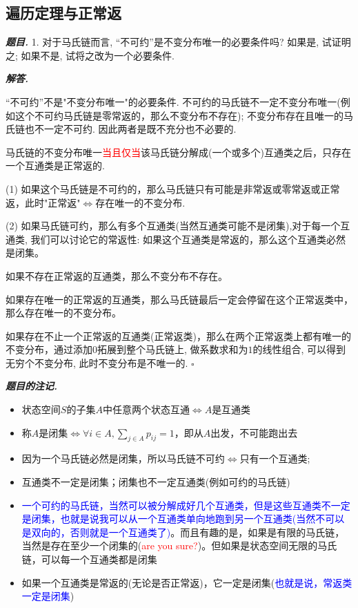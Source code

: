 \documentclass[10pt, a4paper, oneside]{ctexart}
\newenvironment{problem}{\begin{framed}\par\noindent\textbf{\textit{题目. }}}{\end{framed}\par}
\newenvironment{solution}{%
  \par\noindent\textbf{\textit{解答. }}\ignorespaces
}{%
  \hfill\ensuremath{\square}\par %
}
\newenvironment{note}{\par\noindent\textbf{\textit{题目的注记. }}\ignorespaces}{\par}
\begin{document}
\subsection{遍历定理与正常返}
\begin{problem}
    1. 对于马氏链而言, “不可约”是不变分布唯一的必要条件吗? 如果是, 试证明之; 如果不是, 试将之改为一个必要条件.
\end{problem}
\begin{solution}
    “不可约”不是"不变分布唯一"的必要条件. 不可约的马氏链不一定不变分布唯一(例如这个不可约马氏链是零常返的，那么不变分布不存在); 不变分布存在且唯一的马氏链也不一定不可约. 因此两者是既不充分也不必要的.
    
    马氏链的不变分布唯一\textcolor{red}{当且仅当}该马氏链分解成(一个或多个)互通类之后，只存在一个互通类是正常返的.
    
    (1) 如果这个马氏链是不可约的，那么马氏链只有可能是非常返或零常返或正常返，此时"正常返"$\iff$存在唯一的不变分布.

    (2) 如果马氏链可约，那么有多个互通类(当然互通类可能不是闭集),对于每一个互通类, 我们可以讨论它的常返性: 如果这个互通类是常返的，那么这个互通类必然是闭集。
    
    如果不存在正常返的互通类，那么不变分布不存在。
    
    如果存在唯一的正常返的互通类，那么马氏链最后一定会停留在这个正常返类中，那么存在唯一的不变分布。

    如果存在不止一个正常返的互通类(正常返类)，那么在两个正常返类上都有唯一的不变分布，通过添加$0$拓展到整个马氏链上, 做系数求和为$1$的线性组合, 可以得到无穷个不变分布, 此时不变分布是不唯一的.
\end{solution}
\begin{note}
    \begin{itemize}
        \item 状态空间$S$的子集$A$中任意两个状态互通$\iff A$是互通类 
        \item 称$A$是闭集$\iff \forall i\in A, \sum_{j\in A}p_{ij}=1$，即从$A$出发，不可能跑出去
        \item 因为一个马氏链必然是闭集，所以马氏链不可约$\iff$只有一个互通类; 
        \item 互通类不一定是闭集；闭集也不一定互通类(例如可约的马氏链)
        \item \textcolor{blue}{一个可约的马氏链，当然可以被分解成好几个互通类，但是这些互通类不一定是闭集，也就是说我可以从一个互通类单向地跑到另一个互通类(当然不可以是双向的，否则就是一个互通类了)}。而且有趣的是，如果是有限的马氏链，当然是存在至少一个闭集的(\textcolor{red}{are you sure?})。但如果是状态空间无限的马氏链，可以每一个互通类都是闭集
        \item 如果一个互通类是常返的(无论是否正常返)，它一定是闭集(\textcolor{blue}{也就是说，常返类一定是闭集})
    \end{itemize}
\end{note}
\end{document}
